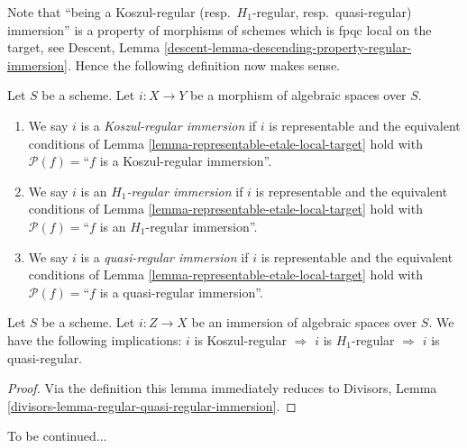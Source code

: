 \noindent
Note that ``being a Koszul-regular (resp.\ $H_1$-regular, resp.\ quasi-regular)
immersion'' is a property of morphisms of schemes which is fpqc local on the
target, see
Descent, Lemma \ref{descent-lemma-descending-property-regular-immersion}.
Hence the following definition now makes sense.

\begin{definition}
\label{definition-regular-immersion}
Let $S$ be a scheme. Let $i : X \to Y$ be a morphism of algebraic
spaces over $S$.
\begin{enumerate}
\item We say $i$ is a {\it Koszul-regular immersion} if $i$ is representable
and the equivalent conditions of
Lemma \ref{lemma-representable-etale-local-target}
hold with $\mathcal{P}(f) =$``$f$ is a Koszul-regular immersion''.
\item We say $i$ is an {\it $H_1$-regular immersion} if $i$ is representable
and the equivalent conditions of
Lemma \ref{lemma-representable-etale-local-target}
hold with $\mathcal{P}(f) =$``$f$ is an $H_1$-regular immersion''.
\item We say $i$ is a {\it quasi-regular immersion} if $i$ is representable
and the equivalent conditions of
Lemma \ref{lemma-representable-etale-local-target}
hold with $\mathcal{P}(f) =$``$f$ is a quasi-regular immersion''.
\end{enumerate}
\end{definition}

\begin{lemma}
\label{lemma-regular-quasi-regular-immersion}
Let $S$ be a scheme.
Let $i : Z \to X$ be an immersion of algebraic spaces over $S$.
We have the following implications:
$i$ is Koszul-regular $\Rightarrow$
$i$ is $H_1$-regular $\Rightarrow$
$i$ is quasi-regular.
\end{lemma}

\begin{proof}
Via the definition this lemma immediately reduces to
Divisors, Lemma \ref{divisors-lemma-regular-quasi-regular-immersion}.
\end{proof}

\noindent
To be continued...

















